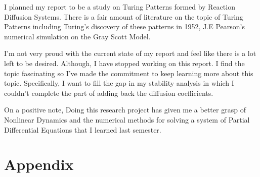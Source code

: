 \documentclass[a4paper, 11pt]{article}
\begin{document}
I planned my report to be a study on Turing Patterns formed by Reaction Diffusion Systems. There is a fair amount of literature on the topic of Turing Patterns including Turing's discovery of these patterns in 1952, J.E Pearson's numerical simulation on the Gray Scott Model.   


I’m not very proud with the current state of my report and feel like there is a lot left to be desired. Although, I have stopped working on this report. I find the topic fascinating so I've made the commitment to keep learning more about this topic. Specifically, I want to fill the gap in my stability analysis in which I couldn't complete the part of adding back the diffusion coefficients. 

On a positive note, Doing this research project has given me a better grasp of Nonlinear Dynamics and the numerical methods for solving a system of Partial Differential Equations that I learned last semester. 

\section{Appendix}
\end{document}
